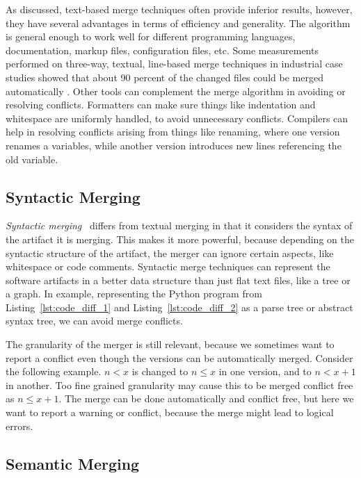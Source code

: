 \documentclass[a4paper,english]{ifimaster}
\begin{document}
As discussed, text-based merge techniques often provide inferior results, however, they have several advantages in terms of efficiency and generality. The algorithm is general enough to work well for different programming languages, documentation, markup files, configuration files, etc. Some measurements performed on three-way, textual, line-based merge techniques in industrial case studies showed that about 90 percent of the changed files could be merged automatically \cite{cite:large_scale_case_study}. Other tools can complement the merge algorithm in avoiding or resolving conflicts. Formatters can make sure things like indentation and whitespace are uniformly handled, to avoid unnecessary conflicts. Compilers can help in resolving conflicts arising from things like renaming, where one version renames a variables, while another version introduces new lines referencing the old variable.

\subsection{Syntactic Merging}%
\label{sub:syntactic_merging}

\textit{Syntactic merging}~\cite{cite:syntactic_software_merging} differs from textual merging in that it considers the syntax of the artifact it is merging. This makes it more powerful, because depending on the syntactic structure of the artifact, the merger can ignore certain aspects, like whitespace or code comments. Syntactic merge techniques can represent the software artifacts in a better data structure than just flat text files, like a tree or a graph. In example, representing the Python program from Listing~\vref{lst:code_diff_1} and Listing~\vref{lst:code_diff_2} as a parse tree or abstract syntax tree, we can avoid merge conflicts.

The granularity of the merger is still relevant, because we sometimes want to report a conflict even though the versions can be automatically merged. Consider the following example. $n < x$ is changed to $n \leq x$ in one version, and to $n < x + 1$ in another. Too fine grained granularity may cause this to be merged conflict free as $n \leq x + 1$. The merge can be done automatically and conflict free, but here we want to report a warning or conflict, because the merge might lead to logical errors.

\subsection{Semantic Merging}%
\label{sub:semantic_merging}
\end{document}
